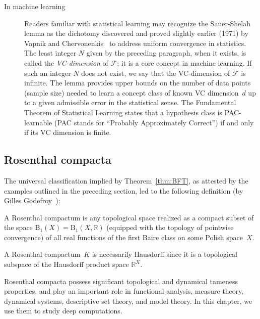 \begin{description}
\item[In machine learning]
Readers familiar with statistical learning may recognize the Sauer-Shelah lemma as the dichotomy discovered and proved slightly earlier (1971) by Vapnik and Chervonenkis~\cite{Vapnik-Chervonenkis:1971, Vapnik-Chervonenkis:1974} to address uniform convergence in statistics.
The least integer $N$ given by the preceding paragraph, when it exists, is called the \emph{VC-dimension} of $\mathscr{F}$;
it is a core concept in machine learning.
If such an integer $N$ does not exist, we say that the VC-dimension of $\mathscr{F}$ is infinite.
The lemma provides upper bounds on the number of data points (sample size) needed to learn a concept class of known VC dimension~$d$ up to a given admissible error in the statistical sense.
The Fundamental Theorem of Statistical Learning states that a hypothesis class is PAC-learnable (PAC stands for ``Probably Approximately Correct'') if and only if its VC dimension is finite.
 
\end{description}
 
\subsection{Rosenthal compacta}
 
The universal classification implied by Theorem~\ref{thm:BFT}, as attested by the examples outlined in the preceding section, led to the following definition (by Gilles Godefroy~\cite{Godefroy:1980}):

\begin{definition}
\label{def:Rosenthal-compacta}
A Rosenthal compactum is any topological space realized as a compact subset of the space $\mathrm{B}_1(X) = \mathrm{B}_1(X, \mathbb{R})$ (equipped with the topology of pointwise convergence) of all real functions of the first Baire class on some Polish space~\(X\).
\end{definition}
A Rosenthal compactum~$K$ is necessarily Hausdorff since it is a topological subspace of the Hausdorff product space $\mathbb{R}^X$.

Rosenthal compacta possess significant topological and dynamical tameness properties, and play an important role in functional analysis, measure theory, dynamical systems, descriptive set theory, and model theory.
In this chapter, we use them to study deep computations.

